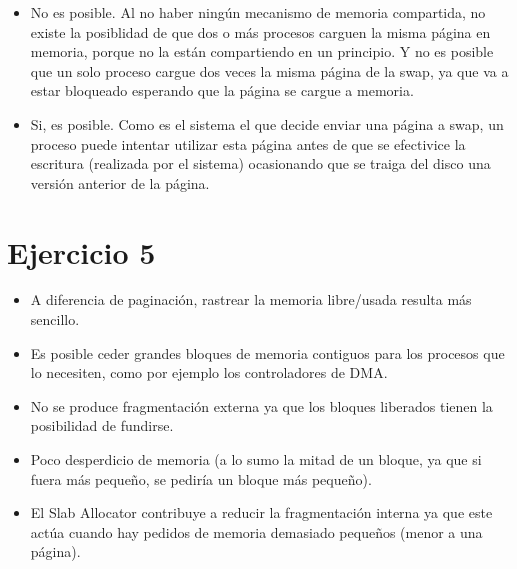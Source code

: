 \documentclass[11pt]{article}
\begin{document}
\begin{itemize}
\item No es posible. Al no haber ningún mecanismo de memoria compartida, no existe
la posiblidad de que dos o más procesos carguen la misma página en memoria, 
porque no la están compartiendo en un principio. Y no es posible que un solo
proceso cargue dos veces la misma página de la swap, ya que va a estar bloqueado
esperando que la página se cargue a memoria.

\item Si, es posible. Como es el sistema el que decide enviar una página a swap, un proceso
puede intentar utilizar esta página antes de que se efectivice la escritura (realizada
por el sistema) ocasionando que se traiga del disco una versión anterior de la página.
\end{itemize}

\section*{Ejercicio 5}

\begin{itemize}
  \item A diferencia de paginación, rastrear la memoria libre/usada resulta más sencillo.
  \item Es posible ceder grandes bloques de memoria contiguos para los procesos que
        lo necesiten, como por ejemplo los controladores de DMA.
  \item No se produce fragmentación externa ya que los bloques liberados tienen la 
  posibilidad de fundirse.
  \item Poco desperdicio de memoria (a lo sumo la mitad de un bloque, ya que si 
  fuera más pequeño, se pediría un bloque más pequeño).
  \item El Slab Allocator contribuye a reducir la fragmentación interna ya que este actúa
  cuando hay pedidos de memoria demasiado pequeños (menor a una página).
\end{itemize}
\end{document}
